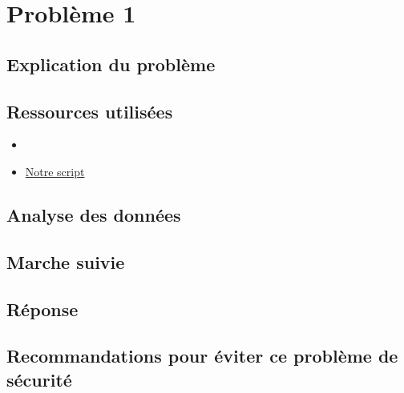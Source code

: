\section{Problème 1}

\subsection{Explication du problème}

\subsection{Ressources utilisées}
\begin{itemize}
    \item 
    \item \href{}{Notre script}
\end{itemize}

\subsection{Analyse des données}

\subsection{Marche suivie}

\subsection{Réponse}

\subsection{Recommandations pour éviter ce problème de sécurité}
